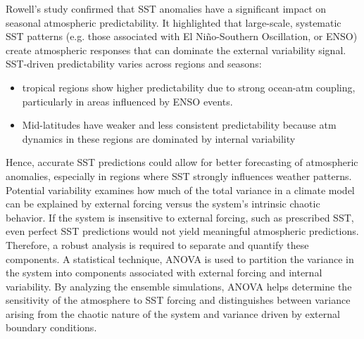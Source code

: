 Rowell's study confirmed that SST anomalies have a significant impact on seasonal atmospheric predictability. It highlighted that large-scale, systematic SST patterns (e.g. those associated with El Niño-Southern Oscillation, or ENSO) create atmospheric responses that can dominate the external variability signal.
SST-driven predictability varies across regions and seasons:
\begin{itemize}
	\item tropical regions show higher predictability due to strong ocean-atm coupling, particularly in areas influenced by ENSO events.
	\item Mid-latitudes have weaker and less consistent predictability because atm dynamics in these regions are dominated by internal variability
\end{itemize}
Hence, accurate SST predictions could allow for better forecasting of atmospheric anomalies, especially in regions where SST strongly influences weather patterns.\\
[0.2cm]


Potential variability examines how much of the total variance in a climate model can be explained by external forcing versus the system's intrinsic chaotic behavior. If the system is insensitive to external forcing, such as prescribed SST, even perfect SST predictions would not yield meaningful atmospheric predictions. Therefore, a robust analysis is required to separate and quantify these components. A statistical technique, ANOVA is used to partition the variance in the system into components associated with external forcing and internal variability. By analyzing the ensemble simulations, ANOVA helps determine the sensitivity of the atmosphere to SST forcing and distinguishes between variance arising from the chaotic nature of the system and variance driven by external boundary conditions.

